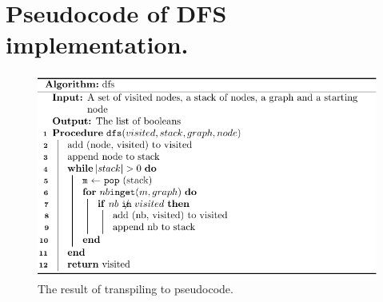 \newpage

\section{Pseudocode of DFS implementation.}
\label{Pseudocode of DFS implementation.}

\begin{figure}[!htb]
    \centering
    \includegraphics[scale=.8]{assets/chapter6/graph/DFS_tbp.pdf}
    \caption{The result of transpiling  to pseudocode.}
    \label{dfsTBP}
\end{figure}